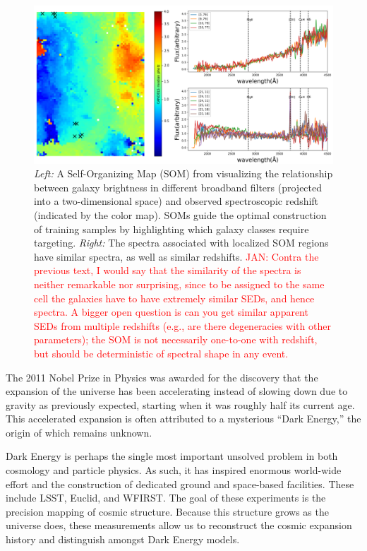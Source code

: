 \documentclass[oneside,11pt]{amsart}
\begin{document}
\begin{figure}[h!]
%
\vskip -0.1in
%
\includegraphics[width=\textwidth]{Hemmati18_Fig8_VVDS_spec.png}
%
\caption{\small \emph{Left:} A Self-Organizing Map (SOM) from
\citet{hemmati18} visualizing the relationship between galaxy
brightness in different broadband filters (projected into a two-dimensional space) and observed spectroscopic redshift (indicated by the color map).
SOMs guide the optimal construction of training samples by highlighting
which galaxy classes require targeting.  \emph{Right:} The
spectra associated with localized SOM regions have similar spectra, as well as similar redshifts. \textcolor{red}{JAN: Contra the previous text, I would say that the similarity of the spectra is neither remarkable nor surprising, since to be assigned to the same cell the galaxies have to have extremely similar SEDs, and hence spectra.  A bigger open question is can you get similar apparent SEDs from multiple redshifts (e.g., are there degeneracies with other parameters); the SOM is not necessarily one-to-one with redshift, but should be deterministic of spectral shape in any event.} }
%
\label{fig:SOM}
%
\end{figure}

The 2011 Nobel Prize in Physics was awarded for the discovery that the expansion of the universe has been accelerating instead of slowing down due to gravity as previously expected, starting when it was roughly half its current age.  This accelerated expansion is often attributed to a mysterious ``Dark Energy,'' the origin of which remains unknown.

Dark Energy is perhaps the single most important unsolved problem in both
cosmology and particle physics.  As such, it has inspired enormous
world-wide effort and the construction of dedicated ground and
space-based facilities.  These include LSST, Euclid, and WFIRST.  The
goal of these experiments is the precision mapping of cosmic structure.
Because this structure grows as the universe does, these measurements allow us to reconstruct the cosmic expansion history and distinguish amongst 
Dark Energy models.
\end{document}
